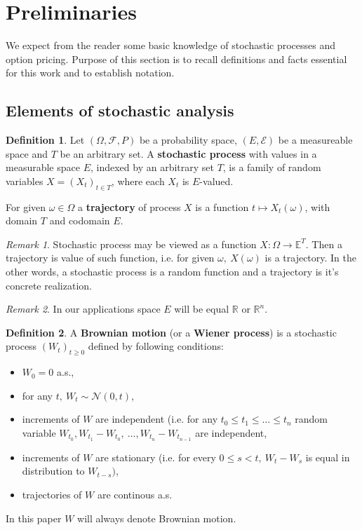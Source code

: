 \documentclass[a4paper,12pt]{article}
\theoremstyle{definition}
\newtheorem{mydef}{Definition}[section]
\theoremstyle{remark}
\newtheorem{remark}{Remark}
\begin{document}
\section{Preliminaries}
We expect from the reader some basic knowledge of stochastic processes and option pricing. Purpose of this section is to recall definitions and facts essential for this work and to establish notation.

\subsection{Elements of stochastic analysis}
\begin{mydef}
 Let $(\Omega, \mathcal{F}, {P})$ be a probability space, $(E, \mathcal{E})$ be a measureable space and $T$ be an arbitrary set. A \textbf{stochastic process} with values in a measurable space $E$, indexed by an arbitrary set $T$, is a family of random variables $X = (X_t)_{t \in T}$, where each $X_t$ is $E$-valued.
 
 For given $\omega \in \Omega$ a \textbf{trajectory} of process $X$ is a function $t \mapsto X_t(\omega)$, with domain $T$ and codomain $E$.
\end{mydef}

\begin{remark}
 Stochastic process may be viewed as a function $X: \Omega \rightarrow \mathbb{E}^T$. Then a trajectory is value of such function, i.e. for given $\omega,\ X(\omega)$ is a trajectory. In the other words, a stochastic process is a random function and a trajectory is it's concrete realization.
\end{remark}

\begin{remark}
 In our applications space $E$ will be equal $\mathbb{R}$ or $\mathbb{R}^n$. 
\end{remark}

\begin{mydef}
 A \textbf{Brownian motion} (or a \textbf{Wiener process}) is a stochastic process $(W_t)_{t \geq 0}$ defined by following conditions:
 \begin{itemize}
  \item $W_0 = 0$ a.s.,
  \item for any $t,\ W_t \sim \mathcal{N}(0,t)$,
  \item increments of $W$ are independent (i.e. for any $t_0 \leq t_1 \leq \ldots \leq t_n$ random variable $W_{t_0}, W_{t_1} - W_{t_0},\ \ldots, W_{t_n} - W_{t_{n-1}}$ are independent,
  \item increments of $W$ are stationary (i.e. for every $0 \leq s < t,\ W_t-W_s$ is equal in distribution to $W_{t-s})$,
  \item trajectories of $W$ are continous a.s.
 \end{itemize}
\end{mydef}
\noindent In this paper $W$ will always denote Brownian motion.
\end{document}
